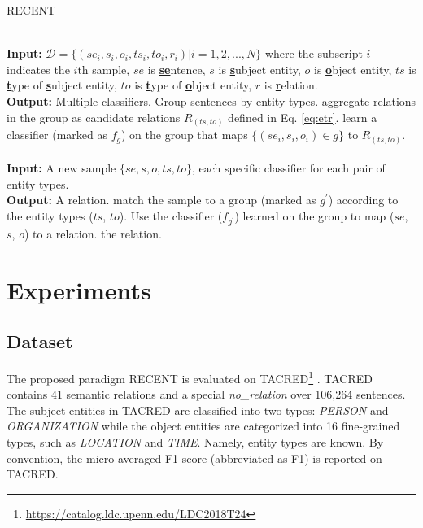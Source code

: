 \documentclass[11pt,a4paper]{article}
\begin{document}
\begin{algorithm}[htb]
	\caption{ RECENT}
	\label{alg:recent}
	\begin{algorithmic}[1] \REQUIRE ~~\\ {\bf Input:} $\mathcal{D} = \{(se_i, s_i,o_i, ts_i,to_i,r_i)|i=1,2,...,N\}$  
		where the subscript $i$ indicates the $i$th sample, $se$ is \textbf{\underline{se}}ntence, $s$ is \textbf{\underline{s}}ubject entity, 
		$o$ is \textbf{\underline{o}}bject entity, $ts$ is \textbf{\underline{t}}ype of \textbf{\underline{s}}ubject entity, $to$ is  \textbf{\underline{t}}ype of \textbf{\underline{o}}bject entity, $r$ is \textbf{\underline{r}}elation. \\
		{\bf Output:} Multiple classifiers.
		\STATE Group sentences by entity types. 
\STATE aggregate relations in the group as  candidate relations $R_{(ts,to)}$ defined in Eq. \ref{eq:etr}.
		\STATE learn a classifier (marked as $f_g$) on the group  that maps $\{(se_i, s_i,o_i) \in g\}$ to $R_{(ts,to)}$. \ENDFOR		
		\ENSURE ~~\\ {\bf Input:}  A new sample $\{se, s,o, ts,to\}$,
					each specific classifier for each pair of entity types.	 \\
		{\bf Output:} A relation.
		\STATE match the sample to a group (marked as $g^{'}$) according to the entity types ($ts$, $to$).
		\STATE Use the classifier ($f_{g^{'}}$) learned on the group to map ($se$, $s$, $o$) to a relation. 
		\RETURN the relation. 
	\end{algorithmic}
\end{algorithm}

\section{Experiments}
\subsection{Dataset} 
The proposed paradigm RECENT is evaluated on TACRED\footnote{\url{https://catalog.ldc.upenn.edu/LDC2018T24}} \cite{zhang-etal-2017-position}. 
TACRED contains 41 semantic relations and a special \textit{no\_relation} over 106,264 sentences. 
The subject entities in TACRED are classified  into two types: \textit{PERSON} and \textit{ORGANIZATION} 
while the object entities are categorized into 16 fine-grained types, such as \textit{LOCATION } and \textit{TIME}.
Namely, entity types are known.
By convention, the micro-averaged F1 score (abbreviated as F1) is reported on TACRED.
\end{document}
